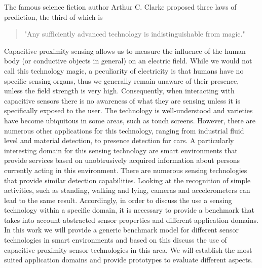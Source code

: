 The famous science fiction author Arthur C. Clarke proposed three laws of prediction, the  third of which is 
\begin{quote}
"Any sufficiently advanced technology is indistinguishable from magic." \cite{clarke1962hazards} 
\end{quote}
Capacitive proximity sensing allows us to measure the influence of the human body (or conductive objects in general) on an electric field. While we would not call this technology magic, a peculiarity of electricity is that humans have no specific sensing organs, thus we generally remain unaware of their presence, unless the field strength is very high. Consequently, when interacting with capacitive sensors there is no awareness of what they are sensing unless it is specifically exposed to the user. The technology is well-understood and varieties have become ubiquitous in some areas, such as touch screens. However, there are numerous other applications for this technology, ranging from industrial fluid level and material detection, to presence detection for cars. A particularly interesting domain for this sensing technology are smart environments that provide services based on unobtrusively acquired information about persons currently acting in this environment. There are numerous sensing technologies that provide similar detection capabilities. Looking at the recognition of simple activities, such as standing, walking and lying, cameras and accelerometers can lead to the same result. Accordingly, in order to discuss the use a sensing technology within a specific domain, it is necessary to provide a benchmark that takes into account abstracted sensor properties and different application domains. In this work we will provide a generic benchmark model for different sensor technologies in smart environments and based on this discuss the use of capacitive proximity sensor technologies in this area. We will establish the most suited application domains and provide prototypes to evaluate different aspects.
